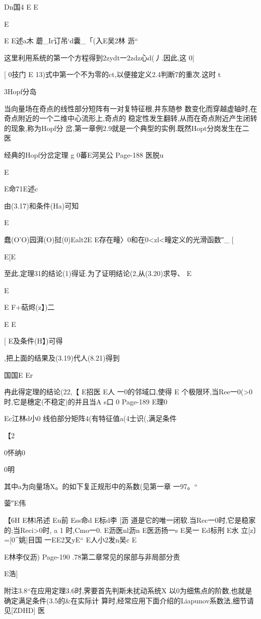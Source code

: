 {{{{{{{{{{{{{{{{{{Dn国4
E
E

E

E
E述a木
蘑_Ir订吊`d囊_「(入E吴2林
沥“

这里利用系统的第一个方程得到2zydt一2zdz心d(丿.因此,这
0|

[
0技门
E
13)式中第一个不为零的ct,以便接定义2.4判断7的重次.这时
t

3Hopf分岛

当向量场在奇点的线性部分短阵有一对复特征根,井东随参
数变化而穿越虚轴时,在奇点附近的一个二维中心流形上,奇点的
稳定性发生翻转,从而在奇点附近产生闭转的现象,称为Hopf分
岔,第一章例2.9就是一个典型的实例.既然Hopt分岗发生在二
医

经典的Hopf分岔定理
g
0蕃E河吴公
Page-188
医脱u

E

E命71E述c

由(3.17)和条件(Ha)可知

E

蠢(O'O)园湃(O)挝(0)Ealt2E
E存在疃〉0和在0<zl<疃定义的光滑函数″_
[

E[E

至此,定理31的结论(1)得证.为了证明结论(2,从(3.20)求导、
E

E

E
F+萜烬(z】)二

E
E

[
E及条件(H】)可得

,把上面的结果及(3.19)代人(8.21)得到

国国E
Er

冉此得定理的结论(22,【
E招医
E人
一0的邻域口,使得
E
个极限环,当Ree一0(>0时,它是穗定(不稳定)的并且当A
s口
0
Page-189
E理0

Ec江林d小0
线伯部分矩阵4(有特征值a(4士识(,满足条件

【2

0怀纳0

0明

其中a为向量场X。的如下复正规形中的系数(见第一章
一97。“

蓥″E伟

【6H
E林l吊述
Eu前
Ess命d
E标d李
[沥
道是它的唯一闭软.当Rec一0时,它是稳家的;当Reci>0时,
a
1
时,Cmo一0.
E沥医nl沥n
E医沥扬一s
E吴一
Ed标刑
E水
立[z〕=[0^姚]目国
一EE2叉yE“
E人小2发n吴c
E

E林李仪沥)
Page-190
.78第二章常见的尿部与非局部分责

E浩]

附注3.8“在应用定理3.6时,霁要首先判斯未扰动系统X
以0为细焦点的阶数,也就是确定满足条件(3.5的&在实际计
算时,经常应用下面介绍的Liapunov系数法,细节请见[ZDHD]
医

}}}}}}}}}}}}}}}}}}
